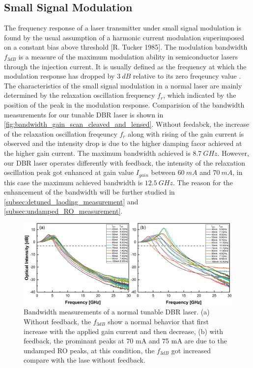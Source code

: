 \subsection{Small Signal Modulation}
The frequency response of a laser transmitter under small signal modulation is found by the usual assumption of a harmonic current modulation superimposed on a constant bias above threshold [R. Tucker 1985]. The modulation bandwidth $f_{3dB}$ is a measure of the maximum modulation ability in semiconductor lasers through the injection current. It is usually defined as the frequency at which the modulation response has dropped by $3 \ dB$ relative to its zero freqeuncy value \cite{ohtsubo2012semiconductor, agrawal2013semiconductor}. The characteristics of the small signal modulation in a normal laser are mainly determined by the relaxation oscillation frequency $f_r$, which indicated by the position of the peak in the modulation response. Comparision of the bandwidth measurements for our tunable DBR laser is shown in \autoref{fig:bandwidth_gain_scan_cleaved_and_lensed}. Without feedabck, the increase of the relaxation oscillation freqeuncy $f_r$ along with rising of the gain current is observed and the intensity drop is due to the higher damping facor achieved at the higher gain current. The maximum bandwidth achieved is $8.7 \ GHz$. However, our DBR laser operates differently with feedback, the intensity of the relaxation oscillation peak got enhanced at gain value $I_{gain}$ between $60 \ mA$ and $70 \ mA$, in this case the maximum achieved bandwidth is $12.5 \ GHz$. The reason for the enhancement of the bandwidth will be further studied in \autoref{subsec:detuned_laoding_measurement} and \autoref{subsec:undamped_RO_measurement}.
\begin{figure}[ht]
    \centering
    \includegraphics[width=\linewidth]{figures/bandwidth_gain_scan_cleaved_and_lensed_grating_4679.png}
    \caption{Bandwidth measurements of a normal tunable DBR laser. (a) Without feedback, the $f_{3dB}$ show a normal behavior that first increase with the applied gain current and then decrease, (b) with feedback, the prominant peaks at 70 mA and 75 mA are due to the undamped RO peaks, at this condition, the $f_{3dB}$ got increased compare with the lase without feedback.}
    \label{fig:bandwidth_gain_scan_cleaved_and_lensed}
\end{figure}

